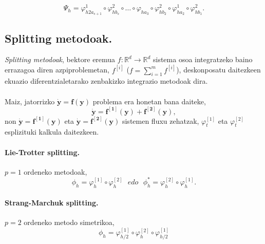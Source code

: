 \begin{equation*}
\Psi_h=\varphi_{h 2 a_{s+1}}^{1} \circ \varphi_{h b_s}^{2} \circ \dots 
       \circ
       \varphi_{h a_3} \circ \varphi_{h b_2}^{2} 
       \circ
       \varphi_{h a_2}^{1} \circ \varphi_{h b_1}^{2}.
\end{equation*}

\subsection{Splitting metodoak.}

\emph{Splitting metodoak}, bektore eremua $f: \mathbb{R}^d \rightarrow \mathbb{R}^d$ sistema osoa integratzeko baino errazagoa diren azpiproblemetan, $f^{[i]}$ ($f=\sum\limits_{i=1}^{m} f^{[i]}$), deskonposatu daitezkeen ekuazio diferentzialetarako zenbakizko integrazio metodoak dira.  

\paragraph*{}Maiz, jatorrizko $\dot{\mathbf{y}}=\mathbf{f}(\mathbf{y})$ problema era honetan bana daiteke,
\begin{equation}
\dot{\mathbf{y}}=\mathbf{f^{[1]}}(\mathbf{y})+\mathbf{f^{[2]}}(\mathbf{y}),
\end{equation} 
non $\dot{\mathbf{y}}=\mathbf{f^{[1]}}(\mathbf{y})$ eta $\dot{\mathbf{y}}=\mathbf{f^{[2]}}(\mathbf{y})$ sistemen fluxu zehatzak, $\varphi_t^{[1]}$ eta $\varphi_t^{[2]}$ esplizituki kalkula daitezkeen. 

\paragraph*{\textbf{Lie-Trotter splitting}.}
$p=1$ ordeneko metodoak,
\begin{equation}
\phi_h = \varphi_h^{[1]} \circ \varphi_h^{[2]} \ \ \ edo \ \ \ \phi_h^{*} = \varphi_h^{[2]} \circ \varphi_h^{[1]} .
\end{equation}

\paragraph*{\textbf{Strang-Marchuk splitting}.}
$p=2$ ordeneko metodo simetrikoa,
\begin{equation}
\phi_h =  \varphi_{{h}/{2}}^{[1]} \circ \varphi_h^{[2]} \circ \varphi_{{h}/{2}}^{[1]}
\end{equation} 

